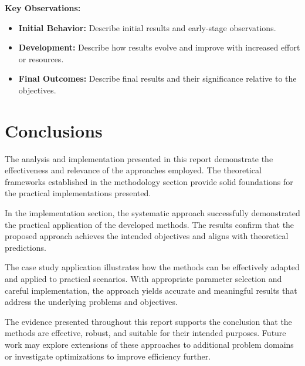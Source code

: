 \textbf{Key Observations:}
\begin{itemize}
    \item \textbf{Initial Behavior:} Describe initial results and early-stage observations.
    \item \textbf{Development:} Describe how results evolve and improve with increased effort or resources.
    \item \textbf{Final Outcomes:} Describe final results and their significance relative to the objectives.
\end{itemize}

\section{Conclusions}

The analysis and implementation presented in this report demonstrate the effectiveness and relevance of the approaches employed. The theoretical frameworks established in the methodology section provide solid foundations for the practical implementations presented.

In the implementation section, the systematic approach successfully demonstrated the practical application of the developed methods. The results confirm that the proposed approach achieves the intended objectives and aligns with theoretical predictions.

The case study application illustrates how the methods can be effectively adapted and applied to practical scenarios. With appropriate parameter selection and careful implementation, the approach yields accurate and meaningful results that address the underlying problems and objectives.

The evidence presented throughout this report supports the conclusion that the methods are effective, robust, and suitable for their intended purposes. Future work may explore extensions of these approaches to additional problem domains or investigate optimizations to improve efficiency further.


% 
% 


